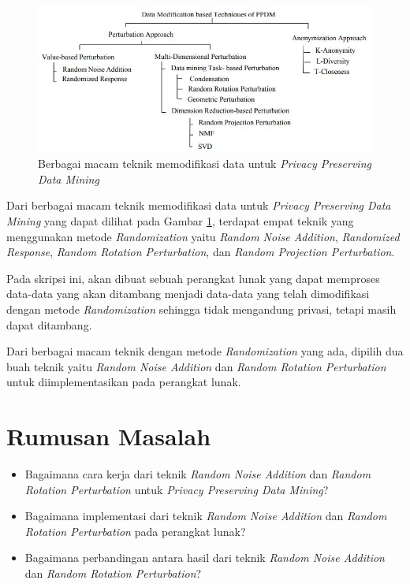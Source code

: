 \documentclass[a4paper,twoside]{article}
\begin{document}
\begin{figure}
	\centering
	\includegraphics[scale=0.785]{ppdm}
	\caption{Berbagai macam teknik memodifikasi data untuk \textit{Privacy Preserving Data Mining}}
	\label{fig:ppdm}
\end{figure}

Dari berbagai macam teknik memodifikasi data untuk \textit{Privacy Preserving Data Mining} yang dapat dilihat pada Gambar \ref{fig:ppdm}, terdapat empat teknik yang menggunakan metode \textit{Randomization} yaitu \textit{Random Noise Addition}, \textit{Randomized Response}, \textit{Random Rotation Perturbation}, dan \textit{Random Projection Perturbation}.

Pada skripsi ini, akan dibuat sebuah perangkat lunak yang dapat memproses data-data yang akan ditambang menjadi data-data yang telah dimodifikasi dengan metode \textit{Randomization} sehingga tidak mengandung privasi, tetapi masih dapat ditambang.

Dari berbagai macam teknik dengan metode \textit{Randomization} yang ada, dipilih dua buah teknik yaitu \textit{Random Noise Addition} dan \textit{Random Rotation Perturbation} untuk diimplementasikan pada perangkat lunak.

\section{Rumusan Masalah}
\begin{itemize}
	\item Bagaimana cara kerja dari teknik \textit{Random Noise Addition} dan \textit{Random Rotation Perturbation} untuk \textit{Privacy Preserving Data Mining}?
	\item Bagaimana implementasi dari teknik \textit{Random Noise Addition} dan \textit{Random Rotation Perturbation} pada perangkat lunak?
	\item Bagaimana perbandingan antara hasil dari teknik \textit{Random Noise Addition} dan \textit{Random Rotation Perturbation}?
\end{itemize}
\end{document}
